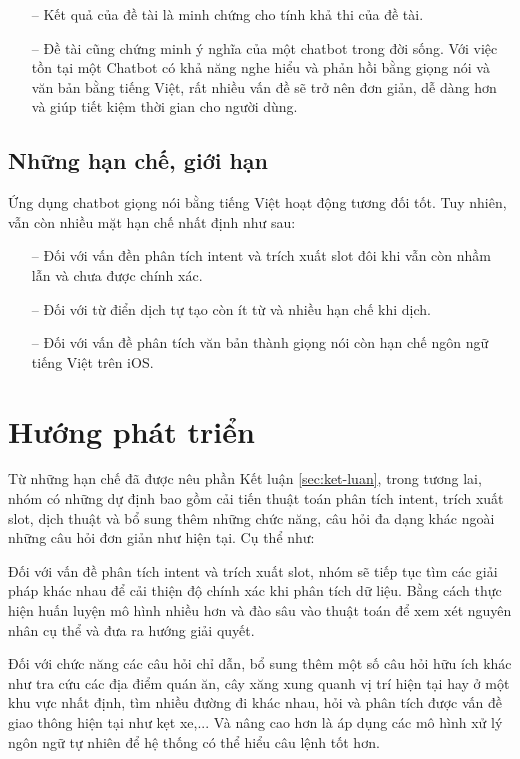 \begin{itemize}
    \item[--] Kết quả của đề tài là minh chứng cho tính khả thi của đề tài.
    \item[--] Đề tài cũng chứng minh ý nghĩa của một chatbot trong đời sống. Với việc tồn tại một Chatbot có khả năng nghe hiểu và phản hồi bằng giọng nói và văn bản bằng tiếng Việt, rất nhiều vấn đề sẽ trở nên đơn giản, dễ dàng hơn và giúp tiết kiệm thời gian cho người dùng.
\end{itemize}

\subsection{Những hạn chế, giới hạn}
Ứng dụng chatbot giọng nói bằng tiếng Việt hoạt động tương đối tốt. Tuy nhiên, vẫn còn nhiều mặt hạn chế nhất định như sau:
\begin{itemize}
    \item[--] Đối với vấn đền phân tích intent và trích xuất slot đôi khi vẫn còn nhầm lẫn và chưa được chính xác.
    \item[--] Đối với từ điển dịch tự tạo còn ít từ và nhiều hạn chế khi dịch.
    \item[--] Đối với vấn đề phân tích văn bản thành giọng nói còn hạn chế ngôn ngữ tiếng Việt trên iOS.
\end{itemize}

\section{Hướng phát triển}


Từ những hạn chế đã được nêu phần Kết luận \ref{sec:ket-luan}, trong tương lai, nhóm có những dự định bao gồm cải tiến thuật toán phân tích intent, trích xuất slot, dịch thuật và bổ sung thêm những chức năng, câu hỏi đa dạng khác ngoài những câu hỏi đơn giản như hiện tại. Cụ thể như:

Đối với vấn đề phân tích intent và trích xuất slot, nhóm sẽ tiếp tục tìm các giải pháp khác nhau để cải thiện độ chính xác khi phân tích dữ liệu. Bằng cách thực hiện huấn luyện mô hình nhiều hơn và đào sâu vào thuật toán để xem xét nguyên nhân cụ thể và đưa ra hướng giải quyết.

Đối với chức năng các câu hỏi chỉ dẫn, bổ sung thêm một số câu hỏi hữu ích khác như tra cứu các địa điểm quán ăn, cây xăng xung quanh vị trí hiện tại hay ở một khu vực nhất định, tìm nhiều đường đi khác nhau, hỏi và phân tích được vấn đề giao thông hiện tại như kẹt xe,... Và nâng cao hơn là áp dụng các mô hình xử lý ngôn ngữ tự nhiên để hệ thống có thể hiểu câu lệnh tốt hơn.
